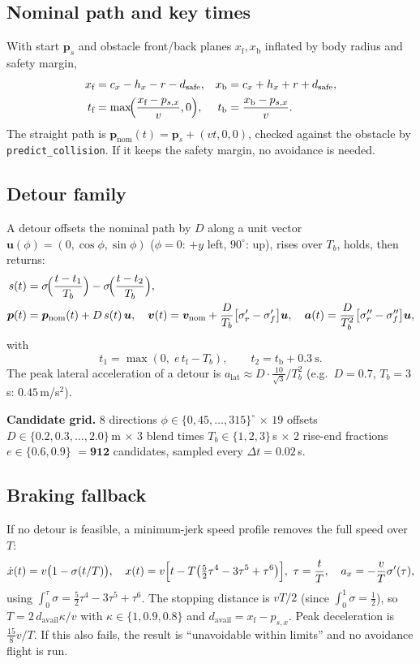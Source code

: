 \documentclass[11pt,a4paper]{article}
\newcommand{\vc}[1]{\bm{#1}}
\newcommand{\code}[1]{\texttt{\small #1}}
\begin{document}
\subsection{Nominal path and key times}
With start $\vc p_s$ and obstacle front/back planes $x_{\text{f}},x_{\text{b}}$ inflated by body radius and safety margin,
\begin{align}
x_{\text{f}}&=c_x-h_x-r-d_{\text{safe}}, & x_{\text{b}}&=c_x+h_x+r+d_{\text{safe}},\\
t_{\text{f}}&=\max\!\Bigl(\frac{x_{\text{f}}-p_{s,x}}{v},0\Bigr), & t_{\text{b}}&=\frac{x_{\text{b}}-p_{s,x}}{v}.
\end{align}
The straight path is $\vc p_{\text{nom}}(t)=\vc p_s+(vt,0,0)$, checked against the obstacle by \code{predict\_collision}. If it keeps the safety margin, no avoidance is needed.

\subsection{Detour family}
A detour offsets the nominal path by $D$ along a unit vector $\vc u(\phi)=(0,\cos\phi,\sin\phi)$ ($\phi=0$: $+y$ left, $90^\circ$: up), rises over $T_b$, holds, then returns:
\begin{align}
s(t)&=\sigma\!\Bigl(\frac{t-t_1}{T_b}\Bigr)-\sigma\!\Bigl(\frac{t-t_2}{T_b}\Bigr),\\
\vc p(t)&=\vc p_{\text{nom}}(t)+D\,s(t)\,\vc u,\quad
\vc v(t)=\vc v_{\text{nom}}+\frac{D}{T_b}\bigl[\sigma'_r-\sigma'_f\bigr]\vc u,\quad
\vc a(t)=\frac{D}{T_b^2}\bigl[\sigma''_r-\sigma''_f\bigr]\vc u,
\end{align}
with
\begin{equation}
t_1=\max(0,\;e\,t_{\text{f}}-T_b),\qquad t_2=t_{\text{b}}+0.3\ \text{s}.
\end{equation}
The peak lateral acceleration of a detour is $a_{\text{lat}}\approx D\cdot\tfrac{10}{\sqrt3}/T_b^2$ (e.g.\ $D=0.7$, $T_b=3$\,s: $0.45$\,m/s$^2$).

\textbf{Candidate grid.} $8$ directions $\phi\in\{0,45,\dots,315\}^\circ$ $\times$ $19$ offsets $D\in\{0.2,0.3,\dots,2.0\}$\,m $\times$ $3$ blend times $T_b\in\{1,2,3\}$\,s
$\times$ $2$ rise-end fractions $e\in\{0.6,0.9\}$ $=\mathbf{912}$ candidates, sampled every $\Delta t=0.02$\,s.

\subsection{Braking fallback}
If no detour is feasible, a minimum-jerk speed profile removes the full speed over $T$:
\begin{equation}
\dot x(t)=v\bigl(1-\sigma(t/T)\bigr),\quad
x(t)=v\Bigl[t-T\bigl(\tfrac52\tau^4-3\tau^5+\tau^6\bigr)\Bigr],\ \tau=\frac tT,\quad
a_x=-\frac{v}{T}\sigma'(\tau),
\end{equation}
using $\int_0^\tau\sigma=\tfrac52\tau^4-3\tau^5+\tau^6$. The stopping distance is $vT/2$ (since $\int_0^1\sigma=\tfrac12$), so $T=2\,d_{\text{avail}}\kappa/v$ with $\kappa\in\{1,0.9,0.8\}$ and $d_{\text{avail}}=x_{\text{f}}-p_{s,x}$.
Peak deceleration is $\tfrac{15}{8}v/T$. If this also fails, the result is ``unavoidable within limits'' and no avoidance flight is run.
\end{document}
